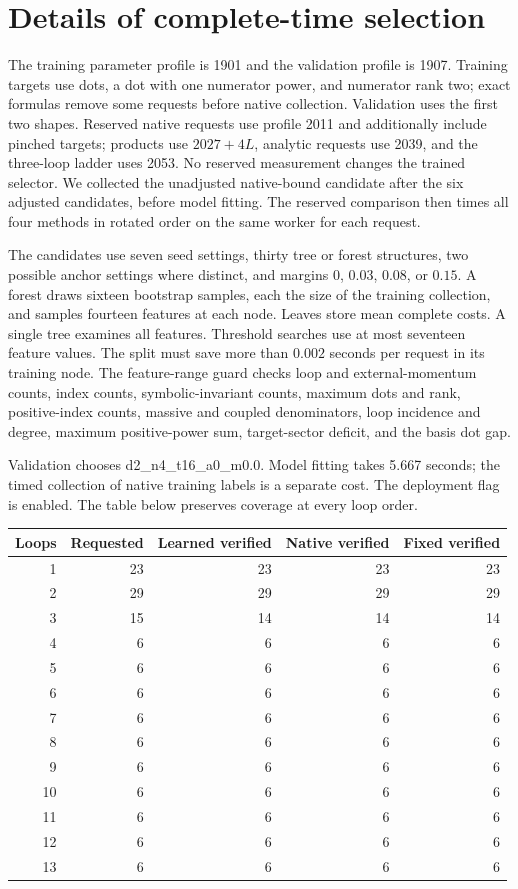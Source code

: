 \section{Details of complete-time selection}
\label{app:total-time-details}
The training parameter profile is 1901 and the validation profile is 1907. Training targets use dots, a dot with one numerator power, and numerator rank two; exact formulas remove some requests before native collection. Validation uses the first two shapes. Reserved native requests use profile 2011 and additionally include pinched targets; products use $2027+4L$, analytic requests use 2039, and the three-loop ladder uses 2053. No reserved measurement changes the trained selector. We collected the unadjusted native-bound candidate after the six adjusted candidates, before model fitting. The reserved comparison then times all four methods in rotated order on the same worker for each request.

The candidates use seven seed settings, thirty tree or forest structures, two possible anchor settings where distinct, and margins $0$, $0.03$, $0.08$, or $0.15$. A forest draws sixteen bootstrap samples, each the size of the training collection, and samples fourteen features at each node. Leaves store mean complete costs. A single tree examines all features. Threshold searches use at most seventeen feature values. The split must save more than $0.002$ seconds per request in its training node. The feature-range guard checks loop and external-momentum counts, index counts, symbolic-invariant counts, maximum dots and rank, positive-index counts, massive and coupled denominators, loop incidence and degree, maximum positive-power sum, target-sector deficit, and the basis dot gap.

Validation chooses d2\_n4\_t16\_a0\_m0.0. Model fitting takes 5.667 seconds; the timed collection of native training labels is a separate cost. The deployment flag is enabled. The table below preserves coverage at every loop order.
\begin{center}\small
\begin{tabular}{@{}rrrrr@{}}\toprule
Loops & Requested & Learned verified & Native verified & Fixed verified\\\midrule
1 & 23 & 23 & 23 & 23\\
2 & 29 & 29 & 29 & 29\\
3 & 15 & 14 & 14 & 14\\
4 & 6 & 6 & 6 & 6\\
5 & 6 & 6 & 6 & 6\\
6 & 6 & 6 & 6 & 6\\
7 & 6 & 6 & 6 & 6\\
8 & 6 & 6 & 6 & 6\\
9 & 6 & 6 & 6 & 6\\
10 & 6 & 6 & 6 & 6\\
11 & 6 & 6 & 6 & 6\\
12 & 6 & 6 & 6 & 6\\
13 & 6 & 6 & 6 & 6\\
\bottomrule\end{tabular}\end{center}
